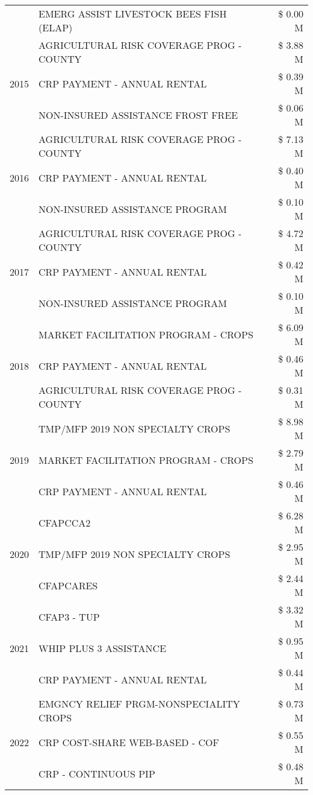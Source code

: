 \begin{tabular}{llr}
 & EMERG ASSIST LIVESTOCK BEES FISH (ELAP) & \$ 0.00 M \\
\cline{1-3}
\multirow[t]{3}{*}{2015} & AGRICULTURAL RISK COVERAGE PROG - COUNTY & \$ 3.88 M \\
 & CRP PAYMENT - ANNUAL RENTAL & \$ 0.39 M \\
 & NON-INSURED ASSISTANCE FROST FREE & \$ 0.06 M \\
\cline{1-3}
\multirow[t]{3}{*}{2016} & AGRICULTURAL RISK COVERAGE PROG - COUNTY & \$ 7.13 M \\
 & CRP PAYMENT - ANNUAL RENTAL & \$ 0.40 M \\
 & NON-INSURED ASSISTANCE PROGRAM & \$ 0.10 M \\
\cline{1-3}
\multirow[t]{3}{*}{2017} & AGRICULTURAL RISK COVERAGE PROG - COUNTY & \$ 4.72 M \\
 & CRP PAYMENT - ANNUAL RENTAL & \$ 0.42 M \\
 & NON-INSURED ASSISTANCE PROGRAM & \$ 0.10 M \\
\cline{1-3}
\multirow[t]{3}{*}{2018} & MARKET FACILITATION PROGRAM - CROPS & \$ 6.09 M \\
 & CRP PAYMENT - ANNUAL RENTAL & \$ 0.46 M \\
 & AGRICULTURAL RISK COVERAGE PROG - COUNTY & \$ 0.31 M \\
\cline{1-3}
\multirow[t]{3}{*}{2019} & TMP/MFP 2019 NON SPECIALTY CROPS & \$ 8.98 M \\
 & MARKET FACILITATION PROGRAM - CROPS & \$ 2.79 M \\
 & CRP PAYMENT - ANNUAL RENTAL & \$ 0.46 M \\
\cline{1-3}
\multirow[t]{3}{*}{2020} & CFAPCCA2 & \$ 6.28 M \\
 & TMP/MFP 2019 NON SPECIALTY CROPS & \$ 2.95 M \\
 & CFAPCARES & \$ 2.44 M \\
\cline{1-3}
\multirow[t]{3}{*}{2021} & CFAP3 - TUP & \$ 3.32 M \\
 & WHIP PLUS 3 ASSISTANCE & \$ 0.95 M \\
 & CRP PAYMENT - ANNUAL RENTAL & \$ 0.44 M \\
\cline{1-3}
\multirow[t]{3}{*}{2022} & EMGNCY RELIEF PRGM-NONSPECIALITY CROPS & \$ 0.73 M \\
 & CRP COST-SHARE WEB-BASED - COF & \$ 0.55 M \\
 & CRP - CONTINUOUS PIP & \$ 0.48 M \\
\cline{1-3}
\bottomrule
\end{tabular}

